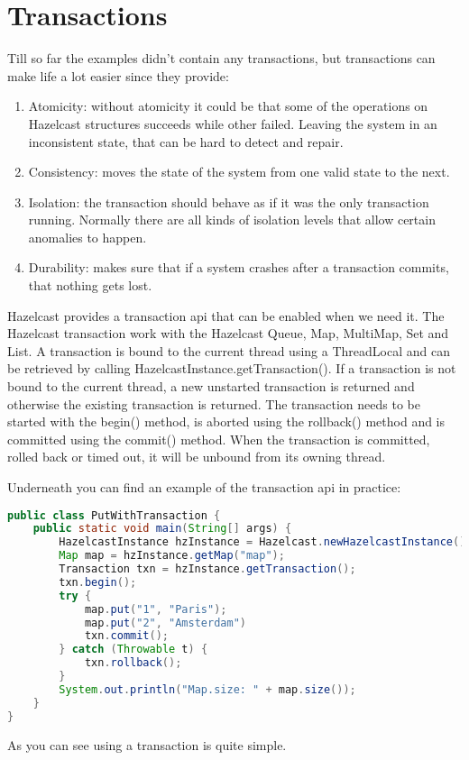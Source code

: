 \chapter{Transactions}
Till so far the examples didn't contain any transactions, but transactions can make life a lot easier since they provide:
\begin{enumerate}
\item Atomicity: without atomicity it could be that some of the operations on Hazelcast structures succeeds while other failed. Leaving the system in an inconsistent state, that can be hard to detect and repair.
\item Consistency: moves the state of the system from one valid state to the next.
\item Isolation: the transaction should behave as if it was the only transaction running. Normally there are all kinds of isolation levels that allow certain anomalies to happen.
\item Durability: makes sure that if a system crashes after a transaction commits, that nothing gets lost. 
\end{enumerate}
Hazelcast provides a transaction api that can be enabled when we need it. The Hazelcast transaction work with the Hazelcast Queue, Map, MultiMap, Set and List. A transaction is bound to the current thread using a ThreadLocal and can be retrieved by calling HazelcastInstance.getTransaction(). If a transaction is not bound to the current thread, a new unstarted transaction is returned and otherwise the existing transaction is returned. The transaction needs to be started with the begin() method, is aborted using the rollback() method and is committed using the commit() method. When the transaction is committed, rolled back or timed out, it will be unbound from its owning thread.

Underneath you can find an example of the transaction api in practice:
\begin{lstlisting}[language=java]
public class PutWithTransaction {
    public static void main(String[] args) {
        HazelcastInstance hzInstance = Hazelcast.newHazelcastInstance();
        Map map = hzInstance.getMap("map");
        Transaction txn = hzInstance.getTransaction();
        txn.begin();
        try {
            map.put("1", "Paris");
            map.put("2", "Amsterdam")
            txn.commit();
        } catch (Throwable t) {
            txn.rollback();
        }
        System.out.println("Map.size: " + map.size());
    }
}
\end{lstlisting}
As you can see using a transaction is quite simple.

